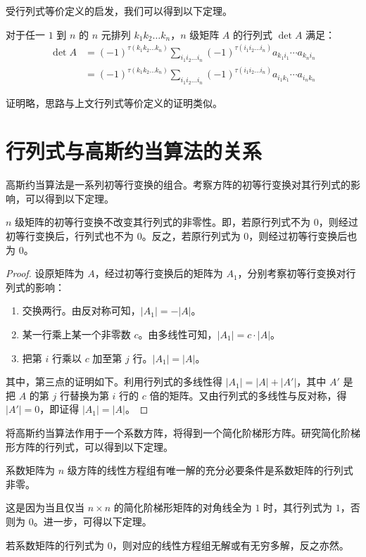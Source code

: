 受行列式等价定义的启发，我们可以得到以下定理。

\begin{theorem}
	对于任一 $1$ 到 $n$ 的 $n$ 元排列 $k_1 k_2 \ldots k_n$，$n$ 级矩阵 $A$ 的行列式 $\det A$ 满足：
	$$
	\begin{aligned}
		\det A &= (-1)^{\tau(k_1 k_2 \ldots k_n)} \sum\limits_{i_1 i_2 \ldots i_n} (-1)^{\tau (i_1 i_2 \ldots i_n)} a_{k_1 i_1} \cdots a_{k_n i_n}
		\\&=
		(-1)^{\tau(k_1 k_2 \ldots k_n)} \sum\limits_{i_1 i_2 \ldots i_n} (-1)^{\tau (i_1 i_2 \ldots i_n)} a_{i_1 k_1} \cdots a_{i_n k_n}
	\end{aligned}
	$$
\end{theorem}

证明略，思路与上文行列式等价定义的证明类似。

\section{行列式与高斯约当算法的关系}

高斯约当算法是一系列初等行变换的组合。考察方阵的初等行变换对其行列式的影响，可以得到以下定理。

\begin{theorem}
	$n$ 级矩阵的初等行变换不改变其行列式的非零性。即，若原行列式不为 $0$，则经过初等行变换后，行列式也不为 $0$。反之，若原行列式为 $0$，则经过初等行变换后也为 $0$。
\end{theorem}

\begin{proof}
	设原矩阵为 $A$，经过初等行变换后的矩阵为 $A_1$，分别考察初等行变换对行列式的影响：
	\begin{enumerate}
		\item 交换两行。由反对称可知，$|A_1| = -|A|$。
		\item 某一行乘上某一个非零数 $c$。由多线性可知，$|A_1| = c \cdot |A|$。
		\item 把第 $i$ 行乘以 $c$ 加至第 $j$ 行。$|A_1| = |A|$。
	\end{enumerate}

	其中，第三点的证明如下。利用行列式的多线性得 $|A_1| = |A| + |A'|$，其中 $A'$ 是把 $A$ 的第 $j$ 行替换为第 $i$ 行的 $c$ 倍的矩阵。又由行列式的多线性与反对称，得 $|A'| = 0$，即证得 $|A_1| = |A|$。
\end{proof}

将高斯约当算法作用于一个系数方阵，将得到一个简化阶梯形方阵。研究简化阶梯形方阵的行列式，可以得到以下定理。

\begin{theorem}
	系数矩阵为 $n$ 级方阵的线性方程组有唯一解的充分必要条件是系数矩阵的行列式非零。
\end{theorem}

这是因为当且仅当 $n \times n$ 的简化阶梯形矩阵的对角线全为 $1$ 时，其行列式为 $1$，否则为 $0$。进一步，可得以下定理。

\begin{theorem}
	若系数矩阵的行列式为 $0$，则对应的线性方程组无解或有无穷多解，反之亦然。
\end{theorem}